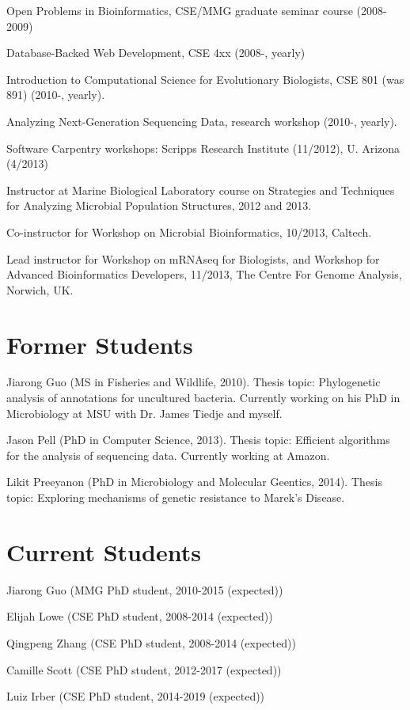 \documentclass[margin,line]{resume}
\begin{document}
\begin{resume}
\begin{list1}
\item[] Open Problems in Bioinformatics, CSE/MMG graduate seminar
  course (2008-2009)
\item[] Database-Backed Web Development, CSE 4xx (2008-, yearly)
\item[] Introduction to Computational Science for Evolutionary Biologists, CSE 801 (was 891) (2010-, yearly).
\item[] Analyzing Next-Generation Sequencing Data, research workshop (2010-, yearly).
\item[] Software Carpentry workshops: Scripps Research Institute (11/2012), U. Arizona (4/2013)
\item[] Instructor at Marine Biological Laboratory course on Strategies and Techniques for Analyzing Microbial Population Structures, 2012 and 2013.
\item[] Co-instructor for Workshop on Microbial Bioinformatics, 10/2013, Caltech.
\item[] Lead instructor for Workshop on mRNAseq for Biologists, and Workshop for Advanced Bioinformatics Developers, 11/2013, The Centre For Genome Analysis, Norwich, UK.
\end{list1}

\section{\mysidestyle Former Students}

Jiarong Guo (MS in Fisheries and Wildlife, 2010).  Thesis topic:
Phylogenetic analysis of annotations for uncultured bacteria.  Currently
working on his PhD in Microbiology at MSU with Dr. James Tiedje and
myself.

Jason Pell (PhD in Computer Science, 2013). Thesis topic: Efficient
algorithms for the analysis of sequencing data.  Currently working at
Amazon.

Likit Preeyanon (PhD in Microbiology and Molecular Geentics, 2014). Thesis
topic: Exploring mechanisms of genetic resistance to Marek's Disease.

\section{\mysidestyle Current Students}

\begin{list1}
\item[] Jiarong Guo (MMG PhD student, 2010-2015 (expected))
\item[] Elijah Lowe (CSE PhD student, 2008-2014 (expected))
\item[] Qingpeng Zhang (CSE PhD student, 2008-2014 (expected))
\item[] Camille Scott (CSE PhD student, 2012-2017 (expected))
\item[] Luiz Irber (CSE PhD student, 2014-2019 (expected))
\end{list1}


\end{resume}
\end{document}
